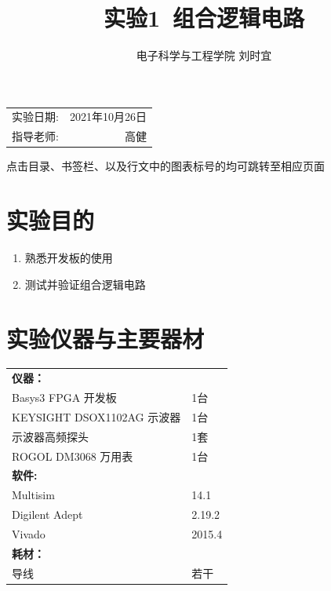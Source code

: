 \documentclass[UTF8]{ctexart}
\title{\textbf{实验1\ 组合逻辑电路}} %
\author{电子科学与工程学院 刘时宜} %
\date{} %
\numberwithin{figure}{subsection}
\numberwithin{table}{subsection}
\numberwithin{equation}{subsection}
\begin{document}
\pagestyle{EE_AnalogExp_template}

\maketitle %

\begin{center}
    \begin{tabular}{l r}
    实验日期: & 2021年10月26日 \\ %
    指导老师: & 高健 %
    \end{tabular}
    \par 点击目录、书签栏、以及行文中的图表标号的均可跳转至相应页面
    \end{center}
    

\tableofcontents

\section{实验目的}
\begin{enumerate}
    \item 熟悉开发板的使用
    \item 测试并验证组合逻辑电路
\end{enumerate}

\section{实验仪器与主要器材}
\begin{center}
    \begin{tabular}{ll}
        \textbf{仪器：} & \\
        Basys3 FPGA 开发板 & 1台\\
        KEYSIGHT DSOX1102AG 示波器 & 1台\\
        示波器高频探头 & 1套\\
        ROGOL DM3068 万用表 & 1台\\
        \textbf{软件:} & \\
        Multisim & 14.1 \\
        Digilent Adept & 2.19.2 \\
        Vivado & 2015.4 \\
        \textbf{耗材：} & \\
        导线 & 若干 \\
    \end{tabular}
\end{center}
\end{document}
